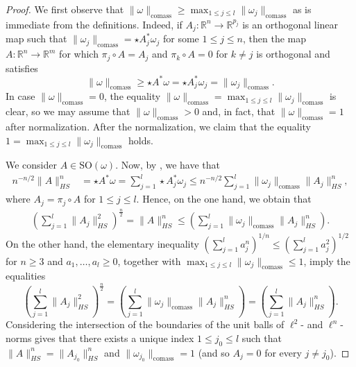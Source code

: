 \documentclass[a4paper,leqno,11pt]{amsart}
\numberwithin{equation}{section}
\theoremstyle{remark}
\theoremstyle{remark}
\newcommand{\R}{\mathbb{R}}
\newcommand{\comass}{\mathrm{comass}}
\newcommand{\SO}{\mathrm{SO}}
\begin{document}
\begin{proof}
We first observe that $\|\omega\|_{\comass} \geq \max_{ 1 \leq j \leq l } \| \omega_j \|_{\comass}$ as is immediate from the definitions. Indeed, if $A_j \colon \R^n \to \R^{ p_j }$ is an orthogonal linear map such that $\|\omega_j\|_{\comass} = \star A_j^{*}\omega_j$ for some $1 \leq j \leq n$, then the map $A \colon \R^n \to \R^m$ for which $\pi_j \circ A = A_j$ and $\pi_{ k } \circ A = 0$ for $k \neq j$ is orthogonal and satisfies
\begin{equation*}
    \|\omega\|_{\comass}
    \geq
    \star A^{*}\omega
    =
    \star A^{*}_j\omega_j
    =
    \|\omega_j\|_{\comass}.
\end{equation*}
In case $\| \omega \|_{\comass} = 0$, the equality $\|\omega\|_{\comass} = \max_{ 1 \leq j \leq l } \| \omega_j \|_{\comass}$ is clear, so we may assume that $\| \omega \|_{\comass} > 0$ and, in fact, that $\| \omega \|_{\comass} = 1$ after normalization. After the normalization, we claim that the equality $1 = \max_{ 1 \leq j \leq l } \|\omega_j\|_{\comass}$ holds.

We consider $A \in \SO( \omega )$. Now, by , we have that
\begin{align*}
    n^{-n/2} \|A\|_{HS}^{n}
    &=
    \star A^{*}\omega
    =
    \sum_{ j = 1 }^{ l } \star A_{j}^{*}\omega_j
    \leq
    n^{-n/2} \sum_{ j = 1 }^{ l } \| \omega_j\|_{\comass} \|A_j\|_{HS}^n,
\end{align*}
where $A_j = \pi_j \circ A$ for $1 \leq j \leq l$. Hence, on the one hand, we obtain that
\begin{align*}
    \left( \sum_{ j = 1 }^{ l } \|A_j\|_{HS}^{2} \right)^{\frac{n}{2}}
    =
    \|A\|_{HS}^{n}
    \leq
    \left( \sum_{ j = 1 }^{ l } \| \omega_j\|_{\comass}\|A_j\|_{HS}^n \right).
\end{align*}
On the other hand, the elementary inequality $( \sum_{ j = 1 }^{ l } a^n_j )^{1/n} \leq ( \sum_{ j = 1 }^{ l } a^{2}_j )^{1/2}$ for $n \geq 3$ and $a_1, \dots, a_l \geq 0$, together with $\max_{ 1 \leq j \leq l }\| \omega_j \|_{\comass} \leq 1$, imply the equalities
\begin{equation*}
    \left( \sum_{ j = 1 }^{ l } \|A_j\|_{HS}^{2} \right)^{\frac{n}{2}}
    =
    \left( \sum_{ j = 1 }^{ l } \| \omega_j\|_{\comass}\|A_j\|_{HS}^n \right)
    =
    \left( \sum_{ j = 1 }^{ l } \|A_j\|_{HS}^n \right).
\end{equation*}
Considering the intersection of the boundaries of the unit balls of $\ell^2$- and $\ell^{n}$-norms gives that there exists a unique index $1 \leq j_0 \leq l$ such that $\| A \|_{HS}^{n} = \| A_{ j_0 } \|_{HS}^n$ and $\| \omega_{j_0} \|_{\comass} = 1$ (and so $A_j = 0$ for every $j \neq j_0$). 


\end{proof}
\end{document}
